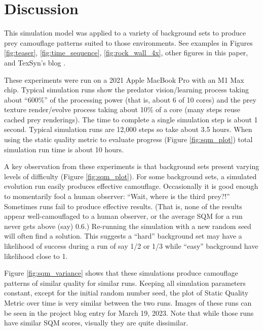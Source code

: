 \documentclass[letterpaper]{article}
\begin{document}
\section{Discussion}
\label{sec:discussion}
This simulation model was applied to a variety of background sets to produce prey camouflage patterns suited to those environments. See examples in Figures \ref{fig:teaser}, \ref{fig:time_sequence}, \ref{fig:rock_wall_4x}, other figures in this paper, and TexSyn's blog \citep{reynolds_texsyn_blog_2023}.
\par
These experiments were run on a 2021 Apple MacBook Pro with an M1 Max chip. Typical simulation runs show the predator vision/learning process taking about ``600\%'' of the processing power (that is, about 6 of 10 cores) and the prey texture render/evolve process taking about 10\% of a core (many steps reuse cached prey renderings). The time to complete a single simulation step is about 1 second. Typical simulation runs are 12,000 steps so take about 3.5 hours. When using the static quality metric to evaluate progress (Figure \ref{fig:sqm_plot}) total simulation run time is about 10 hours.
\par
A key observation from these experiments is that background sets present varying levels of difficulty (Figure \ref{fig:sqm_plot}). For some background sets, a simulated evolution run easily produces effective camouflage. Occasionally it is good enough to momentarily fool a human observer: ``Wait, where is the third prey?!'' Sometimes runs fail to produce effective results. (That is, none of the results appear well-camouflaged to a human observer, or the average SQM for a run never gets above (say) 0.6.) Re-running the simulation with a new random seed will often find a solution. This suggests a ``hard'' background set may have a likelihood of success during a run of say 1/2 or 1/3 while ``easy'' background have likelihood close to 1.
\par
Figure \ref{fig:sqm_variance} shows that these simulations produce  camouflage patterns of similar quality for similar runs. Keeping all simulation parameters constant, except for the initial random number seed, the plot of Static Quality Metric over time is very similar between the two runs. Images of these runs can be seen in the project blog \citep{reynolds_texsyn_blog_2023} entry for March 19, 2023. Note that while those runs have similar SQM scores, visually they are quite dissimilar.
\par

\end{document}
